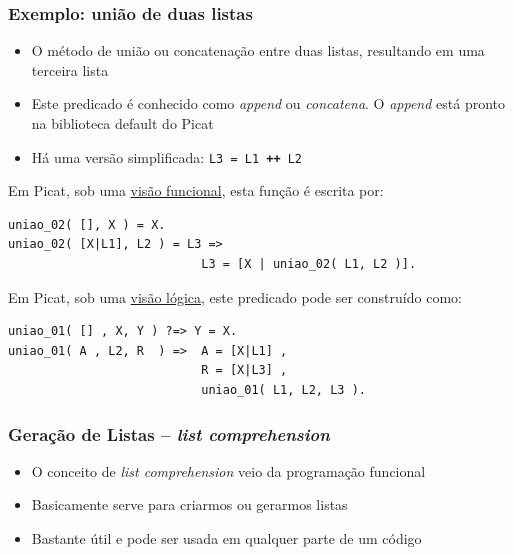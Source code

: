 \begin{frame}[fragile, allowframebreaks=0.9]
\frametitle{Exemplo: união de duas listas}

\begin{itemize}
  \item O método de  união ou concatenação entre duas listas,
 resultando em uma terceira lista

 \item Este predicado é conhecido como \textit{append} ou \textit{concatena}. O \textit{append} está 
pronto na  biblioteca default do Picat

\item Há uma versão simplificada: \texttt{L3 = L1 \textbf{++} L2}

\end{itemize}

Em Picat, sob uma \underline{visão funcional}, esta função é escrita por:
\begin{verbatim}
uniao_02( [], X ) = X. 
uniao_02( [X|L1], L2 ) = L3 => 
                           L3 = [X | uniao_02( L1, L2 )].
\end{verbatim}

\framebreak

Em Picat, sob uma \underline{visão lógica}, este predicado 
pode ser construído como:

\begin{verbatim}
uniao_01( [] , X, Y ) ?=> Y = X. 
uniao_01( A , L2, R  ) =>  A = [X|L1] , 
                           R = [X|L3] , 
                           uniao_01( L1, L2, L3 ).
\end{verbatim}

\end{frame}


\begin{frame}[fragile]

\frametitle{Geração de  Listas -- \textit{list comprehension}}

\begin{block}{}
\begin{itemize}
  \item O conceito de \textit{list comprehension} veio da programação funcional
  \item Basicamente serve para criarmos ou gerarmos listas
  \pause
  \item Bastante útil e pode ser usada em qualquer parte de um código
  
\end{itemize}
\end{block}

\end{frame}



